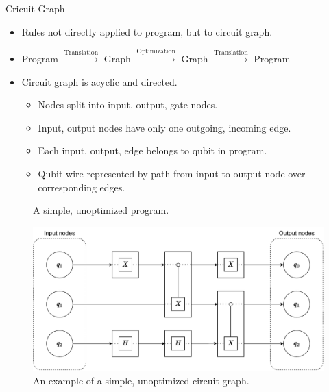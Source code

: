 \begin{frame}{Cricuit Graph}
    \begin{itemize}
        \item Rules not directly applied to program, but to circuit graph.
        \item Program $\xrightarrow{\text{Translation}}$ Graph $\xrightarrow{\text{Optimization}}$ Graph $\xrightarrow{\text{Translation}}$ Program  
        \item Circuit graph is acyclic and directed.
        \begin{itemize}
            \item Nodes split into input, output, gate nodes.
            \item Input, output nodes have only one outgoing, incoming edge. 
            \item Each input, output, edge belongs to qubit in program.
            \item Qubit wire represented by path from input to output node over corresponding edges.
        \end{itemize}
    \end{itemize}
    \vfill
    \begin{minipage}{.35\textwidth}
        \begin{figure}
            \centering
            
            \caption{A simple, unoptimized program.}
        \end{figure}
    \end{minipage}
    \begin{minipage}{.60\textwidth}
        \begin{figure}[htp]
            \centering     
            \includegraphics[width=.9\textwidth]{../figures/drawio/circuit_graph_unoptimized.pdf}
            \caption{An example of a simple, unoptimized circuit graph.}

\end{figure}
\end{minipage}
\end{frame}
